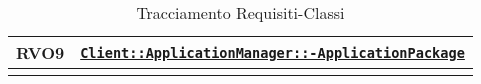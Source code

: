 \begin{longtable}{|>{\centering}m{3cm}|m{10cm}<{\centering}|}
RVO9 & \hyperref[Client::ApplicationManager::ApplicationPackage]{\texttt{Client::ApplicationManager::-\linebreak ApplicationPackage}}\\ \hline

\caption[Tracciamento Requisiti-Classi]{Tracciamento Requisiti-Classi}
\label{tabella:requi-class}
\end{longtable}
\clearpage
